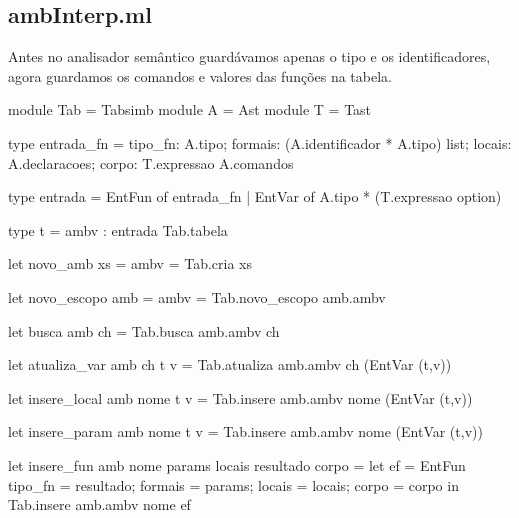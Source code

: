 \documentclass[12pt,a4paper,twoside]{report}
\begin{document}
\subsection{ambInterp.ml}
Antes no analisador semântico guardávamos apenas o tipo e os identificadores, agora guardamos os comandos e valores das funções na tabela.
\begin{terminal}
module Tab = Tabsimb
module A = Ast
module T = Tast

type entrada_fn = {
  tipo_fn:  A.tipo;
  formais: (A.identificador * A.tipo) list;
  locais:  A.declaracoes;
  corpo: T.expressao A.comandos
}

type entrada =  EntFun of entrada_fn
                        |  EntVar of A.tipo * (T.expressao option)

type t = {
  ambv : entrada Tab.tabela
}

let novo_amb xs = { ambv = Tab.cria xs }

let novo_escopo amb = { ambv = Tab.novo_escopo amb.ambv }

let busca amb ch = Tab.busca amb.ambv ch

let atualiza_var amb ch t v =
  Tab.atualiza amb.ambv ch (EntVar (t,v))

let insere_local amb nome t v =
  Tab.insere amb.ambv nome (EntVar (t,v))

let insere_param amb nome t v =
  Tab.insere amb.ambv nome (EntVar (t,v))

let insere_fun amb nome params locais resultado corpo =
  let ef = EntFun { tipo_fn = resultado;
                    formais = params;
                    locais = locais;
                    corpo = corpo }
  in Tab.insere amb.ambv nome ef

\end{terminal}
\end{document}
